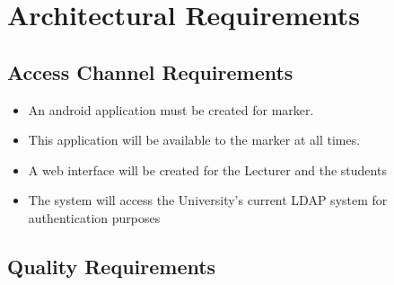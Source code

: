 \section{Architectural Requirements}

\subsection{Access Channel Requirements}

\begin{itemize}

\item An android application must be created for marker.
\item This application will be available to the marker at all times.
\item A web interface will be created for the Lecturer and the students
\item The system will access the University's current LDAP system for authentication purposes

\end{itemize}

\subsection{Quality Requirements}

